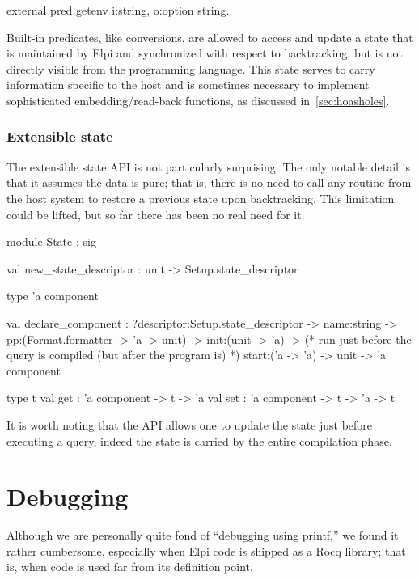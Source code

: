\documentclass[a4paper, 11pt]{book}
\begin{document}
\begin{elpicode}
external pred getenv i:string, o:option string.
\end{elpicode}

Built-in predicates, like conversions, are allowed to access and update a
state that is maintained by Elpi and synchronized with respect to
backtracking, but is not directly visible from the programming language. This
state serves to carry information specific to the host and is sometimes necessary to
implement sophisticated embedding/read-back functions, as discussed
in~\cref{sec:hoasholes}.

\subsubsection{Extensible state}\label{sec:state}

The extensible state API is not particularly surprising. The only notable
detail is that it assumes the data is pure; that is, there is no need to call
any routine from the host system to restore a previous state upon
backtracking. This limitation could be lifted, but so far there has been no
real need for it.

\begin{ocamlcode}
module State : sig

  val new_state_descriptor : unit -> Setup.state_descriptor

  type 'a component

  val declare_component :
    ?descriptor:Setup.state_descriptor ->
    name:string ->
    pp:(Format.formatter -> 'a -> unit) ->
    init:(unit -> 'a) ->
    (* run just before the query is compiled (but after the program is) *)
    start:('a -> 'a) ->
    unit ->
      'a component

  type t
  val get : 'a component -> t -> 'a
  val set : 'a component -> t -> 'a -> t
\end{ocamlcode}

\noindent
It is worth noting that the API allows one to update the state just before
executing a query, indeed the state is carried by the entire compilation
phase.

\section{Debugging}\label{sec:trace}


Although we are personally quite fond of ``debugging using printf,'' we found
it rather cumbersome, especially when Elpi code is shipped as a Rocq library;
that is, when code is used far from its definition point.
\end{document}
